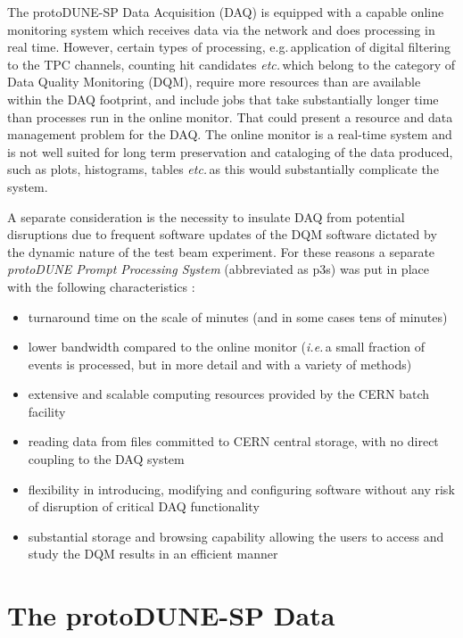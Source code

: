 \documentclass[pdftex,12pt,letter]{article}
\newcommand{\pd}{protoDUNE\xspace}
\begin{document}
The \pd-SP Data Acquisition (DAQ) is equipped with a capable online monitoring system
which receives data via the network and does processing in real time.
However, certain types of processing, e.g.\,application of digital filtering to the TPC channels, counting hit candidates \textit{etc.}\,which belong to the
category of Data Quality Monitoring (DQM), require more resources than are available within
the DAQ footprint, and include jobs that take substantially longer time than processes run in the
online monitor. That could present a resource and data management problem for the DAQ.
The online monitor is a real-time system and is not well suited for long term preservation and
cataloging of the data produced, such as plots, histograms, tables \textit{etc.}\,as this would
substantially complicate the system.

A separate consideration is the necessity to insulate DAQ from
potential disruptions due to frequent software updates of the DQM software dictated by
the dynamic nature of the test beam experiment. 
For these reasons a separate \textit{\pd Prompt Processing System} (abbreviated as p3s) was put
in place  with the following characteristics \cite{eps}:
\begin{itemize} 

\item turnaround time on the scale of minutes (and in some cases tens of minutes)

\item lower bandwidth compared to the online monitor (\textit{i.e.}\,a small fraction of events is processed,
but in more detail and with a variety of methods)

\item extensive and scalable computing resources provided by the CERN batch facility

\item reading data from files committed to CERN central storage, with no direct coupling to the DAQ system

\item flexibility in introducing, modifying and configuring software without any risk of disruption of
critical DAQ functionality

\item substantial storage and browsing capability allowing the users to access and study
the DQM results in an efficient manner

\end{itemize}


\section{The protoDUNE-SP Data}
\end{document}
